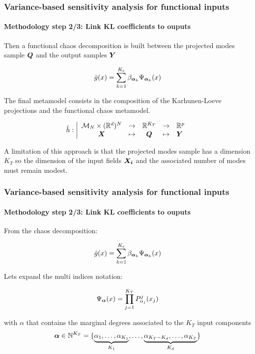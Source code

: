 \documentclass[aspectratio=169]{beamer}
\begin{document}
\begin{frame}
\frametitle{Variance-based sensitivity analysis for functional inputs}

\framesubtitle{Methodology step 2/3: Link KL coefficients to ouputs}

Then a functional chaos decomposition is built between the projected modes\\
sample ${{\mathbf{\boldsymbol{{{\mathbf{\boldsymbol{{Q}}}}}}}}}$ and the output samples ${{\mathbf{\boldsymbol{{{\mathbf{\boldsymbol{{Y}}}}}}}}}$

$$
\tilde{g}(x) = \sum_{k=1}^{K_c} \beta_{{\mathbf{\boldsymbol{{\alpha}}}}_k} \Psi_{{\mathbf{\boldsymbol{{\alpha}}}}_k}(x)
$$

The final metamodel consists in the composition of the Karhunen-Loeve
projections and the functional chaos metamodel.

$$
    \tilde{h}: \left|
      \begin{array}{ccccl}
         {\mathcal M}_N \times (\mathbb{R}^d)^N & \rightarrow & \mathbb{R}^{K_T} & \rightarrow & \mathbb{R}^p \\
         {{\mathbf{\boldsymbol{{{\mathbf{\boldsymbol{{X}}}}}}}}} & \mapsto & {\mathbf{\boldsymbol{{Q}}}} & \mapsto & {\mathbf{\boldsymbol{{Y}}}}
      \end{array}
    \right.
$$

A limitation of this approach is that the projected modes sample has a dimension
$K_T$ so the dimension of the input fields ${{\mathbf{\boldsymbol{{{\mathbf{\boldsymbol{{X_i}}}}}}}}}$
and the associated number of modes must remain modest.

\end{frame}


\begin{frame}
\frametitle{Variance-based sensitivity analysis for functional inputs}

\framesubtitle{Methodology step 2/3: Link KL coefficients to ouputs}

From the chaos decomposition:

$$
\tilde{g}(x) = \sum_{k=1}^{K_c} \beta_{{\mathbf{\boldsymbol{{\alpha}}}}_k} \Psi_{{\mathbf{\boldsymbol{{\alpha}}}}_k}(x)
$$

Lets expand the multi indices notation:

$$
    \Psi_{{\mathbf{\boldsymbol{{\alpha}}}}}(x) = \prod_{j=1}^{K_T} P^j_{\alpha_j}(x_j)
$$

with $\alpha$ that contains the marginal degrees associated to the $K_T$ input components
$$
    {\mathbf{\boldsymbol{{\alpha}}}} \in \mathbb{N}^{K_T} = \{\underbrace{\alpha_1, \dots, \alpha_{K_1}}_{K_1},\dots,\underbrace{\alpha_{K_T-K_d}, \dots, \alpha_{K_T}}_{K_d}\}
$$

\end{frame}
\end{document}
